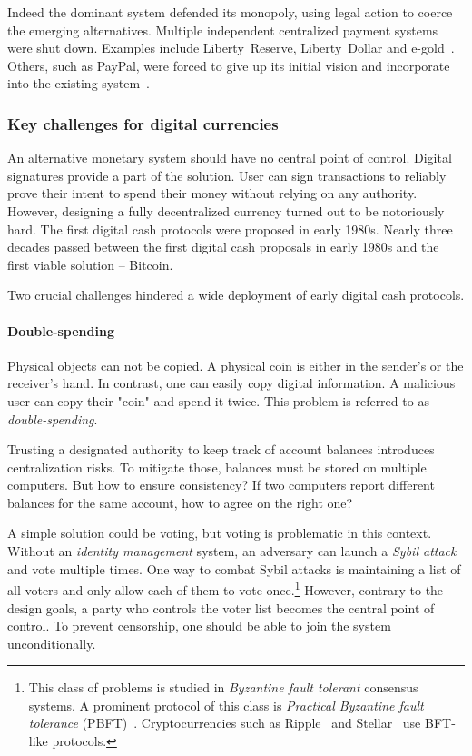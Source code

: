 Indeed the dominant system defended its monopoly, using legal action to coerce the emerging alternatives.
Multiple independent centralized payment systems were shut down.
Examples include Liberty~Reserve, Liberty~Dollar and e-gold~\cite{White2014, Trautman2014}.
Others, such as PayPal, were forced to give up its initial vision and incorporate into the existing system~\cite{Jackson2017}.


\subsubsection*{Key challenges for digital currencies}

An alternative monetary system should have no central point of control.
Digital signatures provide a part of the solution.
User can sign transactions to reliably prove their intent to spend their money without relying on any authority.
However, designing a fully decentralized currency turned out to be notoriously hard.
The first digital cash protocols were proposed in early 1980s.
Nearly three decades passed between the first digital cash proposals in early 1980s and the first viable solution -- Bitcoin.

Two crucial challenges hindered a wide deployment of early digital cash protocols.

\paragraph{Double-spending}

Physical objects can not be copied.
A physical coin is either in the sender's or the receiver's hand.
In contrast, one can easily copy digital information.
A malicious user can copy their "coin" and spend it twice.
This problem is referred to as \textit{double-spending}.

Trusting a designated authority to keep track of account balances introduces centralization risks.
To mitigate those, balances must be stored on multiple computers.
But how to ensure consistency?
If two computers report different balances for the same account, how to agree on the right one?

A simple solution could be voting, but voting is problematic in this context.
Without an \textit{identity management} system, an adversary can launch a \textit{Sybil attack} and vote multiple times.
One way to combat Sybil attacks is maintaining a list of all voters and only allow each of them to vote once.\footnote{This class of problems is studied in \textit{Byzantine fault tolerant} consensus systems.
A prominent protocol of this class is \textit{Practical Byzantine fault tolerance} (PBFT)~\cite{Castro2002}.
Cryptocurrencies such as Ripple~\cite{Schwartz2014} and Stellar~\cite{Mazieres2014} use BFT-like protocols.}
However, contrary to the design goals, a party who controls the voter list becomes the central point of control.
To prevent censorship, one should be able to join the system unconditionally.

